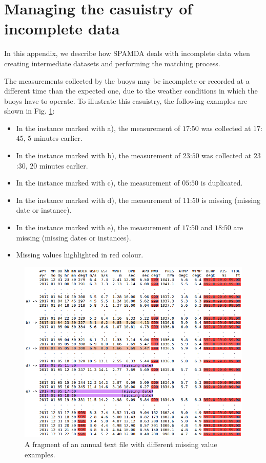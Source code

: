 \documentclass[energies,article,submit,moreauthors,pdftex]{Definitions/mdpi}
\begin{document}
\appendix
\section{Managing the casuistry of incomplete data}\label{app:AppendixA}

		In this appendix, we describe how SPAMDA deals with incomplete data when creating intermediate datasets and performing the matching process.
		
		The measurements collected by the buoys may be incomplete or recorded at a different time than the expected one, due to the weather conditions in which the buoys have to operate. To illustrate this casuistry, the following examples are shown in Fig. \ref{fig:measurements}:		
		\begin{itemize}
			\item In the instance marked with a), the measurement of $17$:$50$ was collected at $17$:$45$, $5$ minutes earlier.
			\item In the instance marked with b), the measurement of $23$:$50$ was collected at $23$:$30$, $20$ minutes earlier.
			\item In the instance marked with c), the measurement of $05$:$50$ is duplicated.
			\item In the instance marked with d), the measurement of $11$:$50$ is missing (missing date or instance).
			\item In the instance marked with e), the measurement of $17$:$50$ and $18$:$50$ are missing (missing dates or instances).
			\item Missing values highlighted in red colour.
		\end{itemize}
		
		\begin{figure}[ht!]
			\centering
			\includegraphics[scale=0.47]{figures/FigureMeasurements.png}
			\caption{A fragment of an annual text file with different missing value examples.}
			\label{fig:measurements}
		\end{figure}
		
\end{document}
